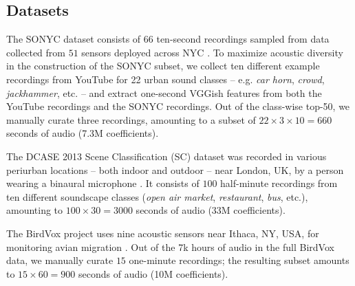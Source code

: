 \documentclass[journal]{IEEEtran}
\makeatletter
\newcommand*{\eg}{e.g.\@\xspace}
\theoremstyle{remark}
\makeatother
\begin{document}
\subsection{Datasets}
The SONYC dataset consists of $66$ ten-second recordings sampled from data collected from $51$ sensors deployed across NYC \cite{bello2018cacm}.
To maximize acoustic diversity in the construction of the SONYC subset, we collect ten different example recordings from YouTube for 22 urban sound classes  -- \eg{}  \textit{car horn}, \textit{crowd}, \textit{jackhammer}, etc. -- and extract one-second VGGish features \cite{hershey2017cnn} from both the YouTube recordings and the SONYC recordings.
Out of the class-wise top-50, we manually curate three recordings, amounting to a subset of $22\times3\times10 = 660$ seconds of audio (7.3M coefficients).

The DCASE 2013 Scene Classification (SC) dataset was recorded in various periurban locations -- both indoor and outdoor -- near London, UK, by a person wearing a binaural microphone \cite{stowell2015detection}.
It consists of $100$ half-minute recordings from ten different soundscape classes (\emph{open air market}, \emph{restaurant}, \emph{bus}, etc.), amounting to $100\times30 = 3000$ seconds of audio (33M coefficients).

The BirdVox project uses nine acoustic sensors near Ithaca, NY, USA, for monitoring avian migration \cite{lostanlen2017icassp}.
Out of the 7k hours of audio in the full BirdVox data, we manually curate $15$ one-minute recordings; the resulting subset amounts to $15\times60 = 900$ seconds of audio (10M coefficients).
\end{document}

